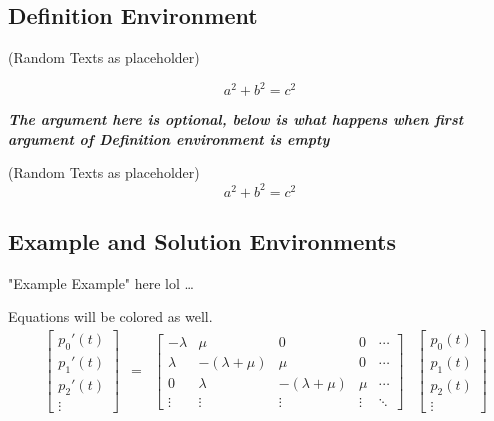 \documentclass[12pt]{article}
\begin{document}
    \subsection{Definition Environment}
    \begin{definition}
        (Random Texts as placeholder) \lipsum[75]%
        
        \begin{equation*}
            a^2 + b^2 = c^2
        \end{equation*}
    \end{definition}

    \textit{\textbf{The argument here is optional, below is what happens when first argument of Definition environment is empty}}

    \begin{definition}[]
        (Random Texts as placeholder) \lipsum[75]%
        \begin{equation*}
            a^2 + b^2 = c^2
        \end{equation*}
    \end{definition}

    \subsection{Example and Solution Environments}

    \begin{example}
        "Example Example" here lol \dots

        Equations will be colored as well.
        \begin{equation*}
            \begin{aligned}
                &\begin{bmatrix}
                    p_0'(t) \\ p_1'(t) \\ p_2'(t) \\ \vdots
                \end{bmatrix} &= 
                &\begin{bmatrix}
                    -\lambda & \mu & 0 & 0 & \cdots\\
                    \lambda & -(\lambda + \mu) & \mu & 0 & \cdots\\
                    0 & \lambda & -(\lambda + \mu) & \mu & \cdots\\
                    \vdots & \vdots & \vdots & \vdots & \ddots
                \end{bmatrix}
                &\begin{bmatrix}
                    p_0(t) \\ p_1(t) \\ p_2(t) \\ \vdots
                \end{bmatrix}
            \end{aligned}
        \end{equation*}

    \end{example}
\end{document}
